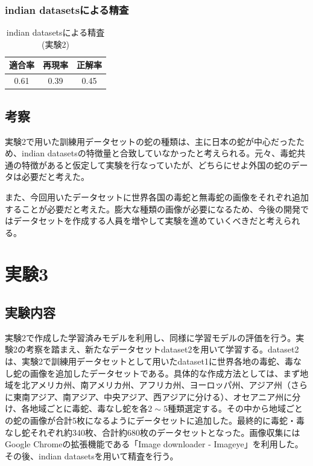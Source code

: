 \documentclass[a4paper, 11pt, titlepage]{jsarticle}
\begin{document}
\subsubsection{indian datasetsによる精査}
\begin{table}[htb]
\centering
  \caption{indian datasetsによる精査(実験2)}
  \begin{tabular}{|c|c|c|}  \hline
    適合率 & 再現率 & 正解率 \\ \hline
    0.61 & 0.39 & 0.45 \\ \hline
  \end{tabular}
\end{table}

\subsection{考察}
実験2で用いた訓練用データセットの蛇の種類は、主に日本の蛇が中心だったため、indian datasetsの特徴量と合致していなかったと考えられる。元々、毒蛇共通の特徴があると仮定して実験を行なっていたが、どちらにせよ外国の蛇のデータは必要だと考えた。\par
また、今回用いたデータセットに世界各国の毒蛇と無毒蛇の画像をそれぞれ追加することが必要だと考えた。膨大な種類の画像が必要になるため、今後の開発ではデータセットを作成する人員を増やして実験を進めていくべきだと考えられる。

\section{実験3}
\subsection{実験内容}
実験2で作成した学習済みモデルを利用し、同様に学習モデルの評価を行う。実験2の考察を踏まえ、新たなデータセットdataset2を用いて学習する。dataset2は、実験2で訓練用データセットとして用いたdataset1に世界各地の毒蛇、毒なし蛇の画像を追加したデータセットである。具体的な作成方法としては、まず地域を北アメリカ州、南アメリカ州、アフリカ州、ヨーロッパ州、アジア州（さらに東南アジア、南アジア、中央アジア、西アジアに分ける）、オセアニア州に分け、各地域ごとに毒蛇、毒なし蛇を各$2\sim5$種類選定する。その中から地域ごとの蛇の画像が合計5枚になるようにデータセットに追加した。最終的に毒蛇・毒なし蛇それぞれ約340枚、合計約680枚のデータセットとなった。画像収集にはGoogle Chromeの拡張機能である「Image downloader - Imageye」を利用した。その後、indian datasetsを用いて精査を行う。\par
\end{document}
